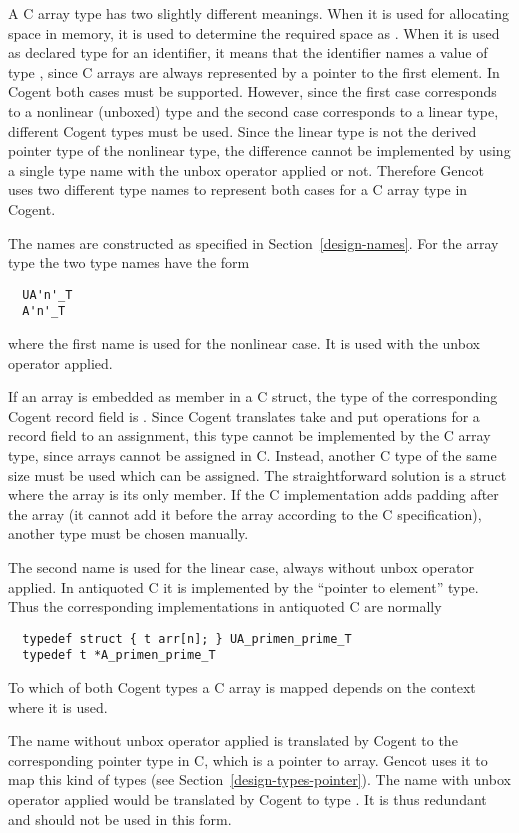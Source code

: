 A C array type  has two slightly different meanings. When it is used for allocating space in memory,
it is used to determine the required space as . When it is used as declared type for an 
identifier, it means that the identifier names a value of type , since C arrays are always represented
by a pointer to the first element. In Cogent both cases must be supported. However, since the first case 
corresponds to a nonlinear (unboxed) type and the second case corresponds to a linear type, different Cogent
types must be used. Since the linear type is not the derived pointer type of the nonlinear type, the 
difference cannot be implemented by using a single type name with the unbox operator applied or not. Therefore
Gencot uses two different type names to represent both cases for a C array type in Cogent.

The names are constructed as specified in Section~\ref{design-names}. For the array type  the two
type names have the form
\begin{verbatim}
  UA'n'_T
  A'n'_T
\end{verbatim}
where the first name is used for the nonlinear case. It is used with the unbox operator applied.

If an array is embedded as member in a C struct, the type of the corresponding Cogent record field
is . Since Cogent translates take and put operations for a record field to an assignment,
this type cannot be implemented by the C array type, since arrays cannot be assigned in C. Instead,
another C type of the same size must be used which can be assigned. The straightforward solution is
a struct where the array is its only member. If the C implementation adds padding after the array (it
cannot add it before the array according to the C specification), another type must be chosen manually.

The second name is used for the linear
case, always without unbox operator applied. In antiquoted C it is implemented by the ``pointer to
element'' type. Thus the corresponding implementations in antiquoted C are normally
\begin{verbatim}
  typedef struct { t arr[n]; } UA_primen_prime_T
  typedef t *A_primen_prime_T
\end{verbatim}

To which of both Cogent types a C array is mapped depends on the context where it is used.

The name  without unbox operator applied is translated by Cogent to the corresponding 
pointer type in C, which is a pointer to array. Gencot uses it to map this kind of types (see 
Section~\ref{design-types-pointer}).
The name  with unbox operator applied would be translated by Cogent to type .
It is thus redundant and should not be used in this form.

